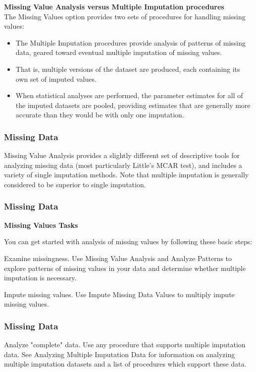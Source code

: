 \documentclass[MASTER.tex]{subfiles}
\begin{document}
	\begin{frame}
\noindent \textbf{Missing Value Analysis versus Multiple Imputation procedures}
\\
The Missing Values option provides two sets of procedures for handling missing values:
\begin{itemize}
\item The Multiple Imputation procedures provide analysis of patterns of missing data, geared toward eventual multiple imputation of missing values. 
\item That is, multiple versions of the dataset are produced, each containing its own set of imputed values. 
\item When statistical analyses are performed, the parameter estimates for all of the imputed datasets are pooled, providing estimates that are generally more accurate than they would be with only one imputation.
\end{itemize}
	\end{frame}
	\begin{frame}
		\frametitle{Missing Data}
		\Large
Missing Value Analysis provides a slightly different set of descriptive tools for analyzing missing data (most particularly Little's MCAR test), and includes a variety of single imputation methods. Note that multiple imputation is generally considered to be superior to single imputation.
	\end{frame}
	\begin{frame}
		\frametitle{Missing Data}
		\Large
\noindent \textbf{Missing Values Tasks}

You can get started with analysis of missing values by following these basic steps:

 Examine missingness. Use Missing Value Analysis and Analyze Patterns to explore patterns of missing values in your data and determine whether multiple imputation is necessary.

 Impute missing values. Use Impute Missing Data Values to multiply impute missing values.	
 \end{frame}
\begin{frame}
	\frametitle{Missing Data}
	\Large
	
 Analyze "complete" data. Use any procedure that supports multiple imputation data. See Analyzing Multiple Imputation Data for information on analyzing multiple imputation datasets and a list of procedures which support these data.
	\end{frame}
\end{document}
